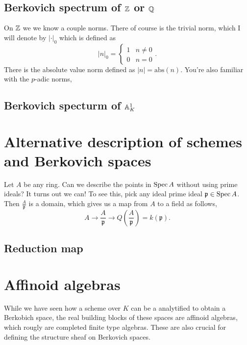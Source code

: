 \subsection{Berkovich spectrum of $\mathbb{Z}$ or $\mathbb{Q}$} \label{sec:berkovich_spectrum_of_Z}

On $\mathbb{Z}$ we we know a couple norms. There of course is the trivial norm, which I will denote by $|\cdot |_0$ which is defined as \[
|n|_0 = \begin{cases}
	1 & n \ne 0 \\
	0 & n = 0
\end{cases}
.\]  
There is the absolute value norm defined as $|n| = \mathrm{abs}(n)$. You're also familiar with the $p$-adic norms, 



\subsection{Berkovich specturm of $\mathbb{A}^{1}_K$} \label{sec:berkovich_specturm_of_affine_line}





\section{Alternative description of schemes and Berkovich spaces} \label{sec:alternative_description_of_schemes_and_berkovich_spaces}

Let $A$ be any ring. Can we describe the points in $\operatorname{Spec} A$ without using prime ideals? It turns out we can!
To see this, pick any ideal prime ideal $\mathfrak{p} \in \operatorname{Spec} A$. Then $\frac{A}{\mathfrak{p} }$ is a domain, which gives us a map from $A$ to a field as follows, \[
	A \to \frac{A}{\mathfrak{p} } \to Q\left( \frac{A}{\mathfrak{p} } \right) = k(\mathfrak{p} )
.\] 

\subsection{Reduction map} \label{sec:reduction_map}

\section{Affinoid algebras} \label{sec:affinoid_algebras}

While we have seen how a scheme over $K$ can be a analytified to obtain a Berkobich space, the real building blocks of these spaces are affinoid algebras, which rougly are completed finite type algebras. 
These are also crucial for defining the structure sheaf on Berkovich spaces. 

